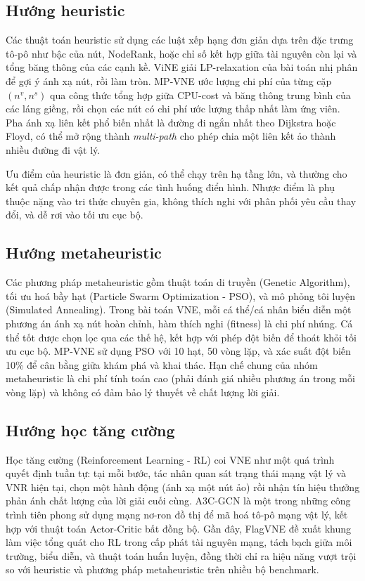 \documentclass[../DoAn.tex]{subfiles}
\begin{document}
\subsection{Hướng heuristic}

Các thuật toán heuristic sử dụng các luật xếp hạng đơn giản dựa trên đặc trưng tô-pô như bậc của nút, NodeRank\cite{cheng2011vne_nr}, hoặc chỉ số kết hợp giữa tài nguyên còn lại và tổng băng thông của các cạnh kề. ViNE\cite{chowdhury2009vine} giải LP-relaxation của bài toán nhị phân để gợi ý ánh xạ nút, rồi làm tròn. MP-VNE\cite{mp_vne} ước lượng chi phí của từng cặp $(n^v, n^s)$ qua công thức tổng hợp giữa CPU-cost và băng thông trung bình của các láng giềng, rồi chọn các nút có chi phí ước lượng thấp nhất làm ứng viên. Pha ánh xạ liên kết phổ biến nhất là đường đi ngắn nhất theo Dijkstra hoặc Floyd, có thể mở rộng thành \textit{multi-path} cho phép chia một liên kết ảo thành nhiều đường đi vật lý.

Ưu điểm của heuristic là đơn giản, có thể chạy trên hạ tầng lớn, và thường cho kết quả chấp nhận được trong các tình huống điển hình. Nhược điểm là phụ thuộc nặng vào tri thức chuyên gia, không thích nghi với phân phối yêu cầu thay đổi, và dễ rơi vào tối ưu cục bộ.

\subsection{Hướng metaheuristic}

Các phương pháp metaheuristic gồm thuật toán di truyền (Genetic Algorithm), tối ưu hoá bầy hạt (Particle Swarm Optimization - PSO), và mô phỏng tôi luyện (Simulated Annealing). Trong bài toán VNE, mỗi cá thể/cá nhân biểu diễn một phương án ánh xạ nút hoàn chỉnh, hàm thích nghi (fitness) là chi phí nhúng. Cá thể tốt được chọn lọc qua các thế hệ, kết hợp với phép đột biến để thoát khỏi tối ưu cục bộ. MP-VNE\cite{mp_vne} sử dụng PSO với 10 hạt, 50 vòng lặp, và xác suất đột biến 10\% để cân bằng giữa khám phá và khai thác. Hạn chế chung của nhóm metaheuristic là chi phí tính toán cao (phải đánh giá nhiều phương án trong mỗi vòng lặp) và không có đảm bảo lý thuyết về chất lượng lời giải.

\subsection{Hướng học tăng cường}

Học tăng cường (Reinforcement Learning - RL) coi VNE như một quá trình quyết định tuần tự: tại mỗi bước, tác nhân quan sát trạng thái mạng vật lý và VNR hiện tại, chọn một hành động (ánh xạ một nút ảo) rồi nhận tín hiệu thưởng phản ánh chất lượng của lời giải cuối cùng. A3C-GCN\cite{yao2018a3c_gcn} là một trong những công trình tiên phong sử dụng mạng nơ-ron đồ thị để mã hoá tô-pô mạng vật lý, kết hợp với thuật toán Actor-Critic bất đồng bộ. Gần đây, FlagVNE\cite{flagvne2024} đề xuất khung làm việc tổng quát cho RL trong cấp phát tài nguyên mạng, tách bạch giữa môi trường, biểu diễn, và thuật toán huấn luyện, đồng thời chỉ ra hiệu năng vượt trội so với heuristic và phương pháp metaheuristic trên nhiều bộ benchmark.
\end{document}
